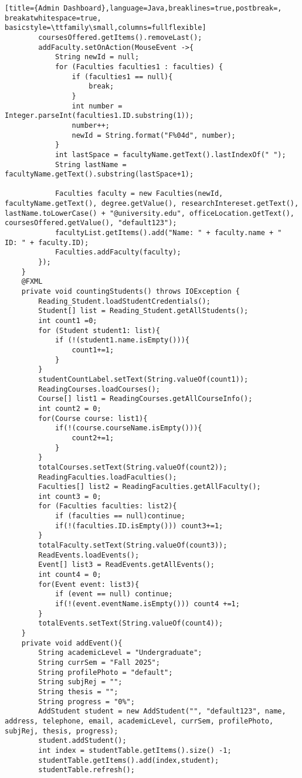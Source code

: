 \begin{lstlisting}[title={Admin Dashboard},language=Java,breaklines=true,postbreak=, breakatwhitespace=true, basicstyle=\ttfamily\small,columns=fullflexible]
        coursesOffered.getItems().removeLast();
        addFaculty.setOnAction(MouseEvent ->{
            String newId = null;
            for (Faculties faculties1 : faculties) {
                if (faculties1 == null){
                    break;
                }
                int number = Integer.parseInt(faculties1.ID.substring(1));
                number++;
                newId = String.format("F%04d", number);
            }
            int lastSpace = facultyName.getText().lastIndexOf(" ");
            String lastName = facultyName.getText().substring(lastSpace+1);

            Faculties faculty = new Faculties(newId, facultyName.getText(), degree.getValue(), researchIntereset.getText(), lastName.toLowerCase() + "@university.edu", officeLocation.getText(), coursesOffered.getValue(), "default123");
            facultyList.getItems().add("Name: " + faculty.name + "         ID: " + faculty.ID);
            Faculties.addFaculty(faculty);
        });
    }
    @FXML
    private void countingStudents() throws IOException {
        Reading_Student.loadStudentCredentials();
        Student[] list = Reading_Student.getAllStudents();
        int count1 =0;
        for (Student student1: list){
            if (!(student1.name.isEmpty())){
                count1+=1;
            }
        }
        studentCountLabel.setText(String.valueOf(count1));
        ReadingCourses.loadCourses();
        Course[] list1 = ReadingCourses.getAllCourseInfo();
        int count2 = 0;
        for(Course course: list1){
            if(!(course.courseName.isEmpty())){
                count2+=1;
            }
        }
        totalCourses.setText(String.valueOf(count2));
        ReadingFaculties.loadFaculties();
        Faculties[] list2 = ReadingFaculties.getAllFaculty();
        int count3 = 0;
        for (Faculties faculties: list2){
            if (faculties == null)continue;
            if(!(faculties.ID.isEmpty())) count3+=1;
        }
        totalFaculty.setText(String.valueOf(count3));
        ReadEvents.loadEvents();
        Event[] list3 = ReadEvents.getAllEvents();
        int count4 = 0;
        for(Event event: list3){
            if (event == null) continue;
            if(!(event.eventName.isEmpty())) count4 +=1;
        }
        totalEvents.setText(String.valueOf(count4));
    }
    private void addEvent(){
        String academicLevel = "Undergraduate";
        String currSem = "Fall 2025";
        String profilePhoto = "default";
        String subjRej = "";
        String thesis = "";
        String progress = "0%";
        AddStudent student = new AddStudent("", "default123", name, address, telephone, email, academicLevel, currSem, profilePhoto, subjRej, thesis, progress);
        student.addStudent();
        int index = studentTable.getItems().size() -1;
        studentTable.getItems().add(index,student);
        studentTable.refresh();


\end{lstlisting}
